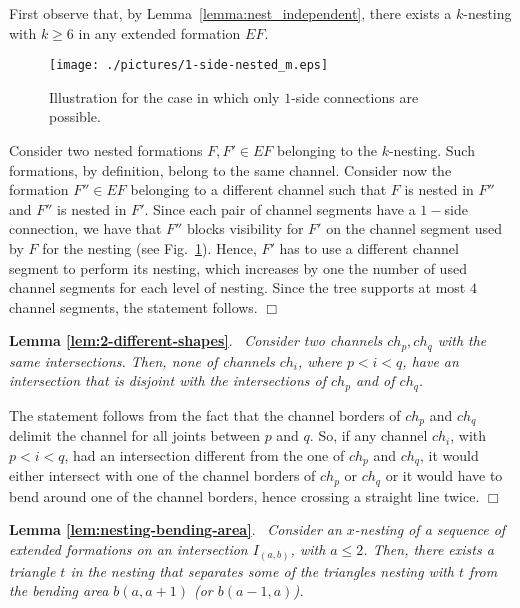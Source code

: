 \documentclass[a4paper,10pt]{llncs}
\renewenvironment{proof}
{{\bf Proof:}}{\hspace*{\fill}$\Box$\par\vspace{2mm}}
\newcommand{\rephrase}[3]{\noindent\textbf{#1 #2}.~\emph{#3}}
\begin{document}
\begin{proof}
First observe that, by Lemma~\ref{lemma:nest_independent}, there exists a $k$-nesting with $k\geq 6$ in any extended formation $EF$.

\begin{figure}[ht]
\begin{center}
\texttt{[image: ./pictures/1-side-nested\_m.eps]}
\caption{Illustration for the case in which only $1$-side connections are possible.}
\label{fig:1-side-nested}
\end{center}
\end{figure}

Consider two nested formations $F,F' \in EF$ belonging to the $k$-nesting. Such formations, by definition, belong to the same channel. Consider now the formation $F'' \in EF$ belonging to a different channel such that $F$ is nested in $F''$ and $F''$ is nested in $F'$. Since each pair of channel segments have a $1-$side connection, we have that $F''$ blocks visibility for $F'$ on the channel segment used by $F$ for the nesting (see Fig.~\ref{fig:1-side-nested}). Hence, $F'$ has to use a different channel segment to perform its nesting, which increases by one the number of used channel segments for each level of nesting. Since the tree supports at most $4$ channel segments, the statement follows.
\end{proof}

\rephrase{Lemma}{\ref{lem:2-different-shapes}}{
Consider two channels $ch_p,ch_q$ with the same intersections. Then, none of channels $ch_i$, where $p<i<q$, have an intersection that is disjoint with the intersections of $ch_p$ and of $ch_q$.
}

\begin{proof}
The statement follows from the fact that the channel borders of $ch_p$ and $ch_q$ delimit the channel for all joints between $p$ and $q$. So, if any channel $ch_i$, with $p<i<q$, had an intersection different from the one of $ch_p$ and $ch_q$, it would either intersect with one of the channel borders of $ch_p$ or $ch_q$ or it would have to bend around one of the channel borders, hence crossing a straight line twice.
\end{proof}

\rephrase{Lemma}{\ref{lem:nesting-bending-area}}{
Consider an $x$-nesting of a sequence of extended formations on an intersection $I_{(a,b)}$, with $a\leq 2$.
Then, there exists a triangle $t$ in the nesting that separates some of the triangles nesting with $t$ from the bending area $b(a,a+1)$ (or $b(a-1,a)$).
}
\end{document}
